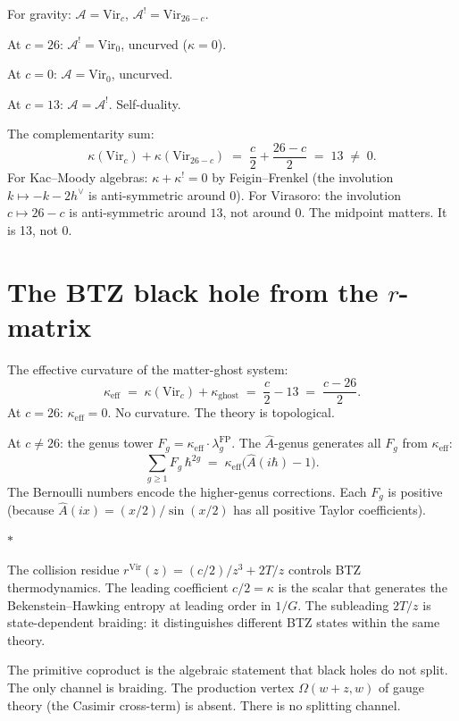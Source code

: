 \documentclass[11pt]{article}
\newcommand{\cA}{\mathcal{A}}
\newcommand{\sep}{\bigskip\begin{center}$*$\end{center}\medskip}
\begin{document}
For gravity: $\cA = \mathrm{Vir}_c$,
$\cA^! = \mathrm{Vir}_{26-c}$.

At $c = 26$: $\cA^! = \mathrm{Vir}_0$, uncurved
($\kappa = 0$).

At $c = 0$: $\cA = \mathrm{Vir}_0$, uncurved.

At $c = 13$: $\cA = \cA^!$.  Self-duality.

\medskip

The complementarity sum:
\[
\kappa(\mathrm{Vir}_c) + \kappa(\mathrm{Vir}_{26-c})
\;=\; \frac{c}{2} + \frac{26-c}{2} \;=\; 13 \;\neq\; 0.
\]
For Kac--Moody algebras: $\kappa + \kappa^! = 0$ by
Feigin--Frenkel (the involution $k \mapsto -k-2h^\vee$ is
anti-symmetric around $0$).  For Virasoro: the involution
$c \mapsto 26-c$ is anti-symmetric around $13$, not around $0$.
The midpoint matters.  It is 13, not 0.


\section{The BTZ black hole from the $r$-matrix}
\label{sec:btz}

The effective curvature of the matter-ghost system:
\[
\kappa_{\mathrm{eff}}
\;=\;
\kappa(\mathrm{Vir}_c) + \kappa_{\mathrm{ghost}}
\;=\;
\frac{c}{2} - 13
\;=\;
\frac{c-26}{2}.
\]
At $c = 26$: $\kappa_{\mathrm{eff}} = 0$.  No curvature.
The theory is topological.

At $c \neq 26$: the genus tower
$F_g = \kappa_{\mathrm{eff}} \cdot \lambda_g^{\mathrm{FP}}$.
The $\hat{A}$-genus generates all $F_g$ from $\kappa_{\mathrm{eff}}$:
\[
\sum_{g \geq 1} F_g\,\hbar^{2g}
\;=\;
\kappa_{\mathrm{eff}}
\bigl(\hat{A}(i\hbar) - 1\bigr).
\]
The Bernoulli numbers encode the higher-genus corrections.  Each
$F_g$ is positive (because $\hat{A}(ix) = (x/2)/\sin(x/2)$ has
all positive Taylor coefficients).

\sep

The collision residue
$r^{\mathrm{Vir}}(z) = (c/2)/z^3 + 2T/z$ controls BTZ
thermodynamics.  The leading coefficient $c/2 = \kappa$ is the
scalar that generates the Bekenstein--Hawking entropy at leading
order in $1/G$.  The subleading $2T/z$ is state-dependent braiding:
it distinguishes different BTZ states within the same theory.

The primitive coproduct is the algebraic statement that black holes
do not split.  The only channel is braiding.  The production
vertex $\Omega(w{+}z,w)$ of gauge theory (the Casimir cross-term)
is absent.  There is no splitting channel.
\end{document}
